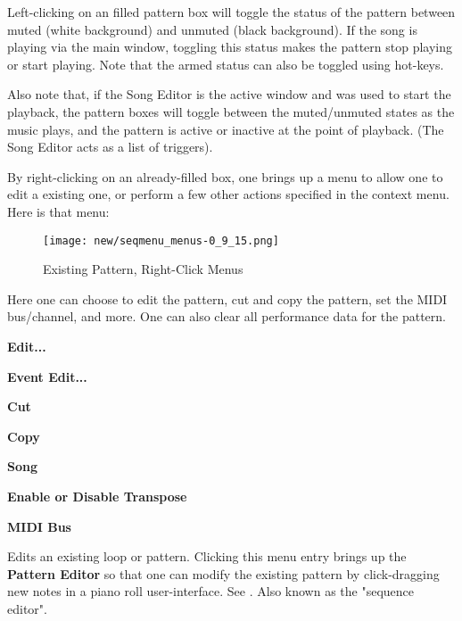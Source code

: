   Left-clicking on an filled pattern box will toggle the status of the
   pattern between muted (white background) and unmuted (black background).
   If the song is playing via the main window, toggling this status makes
   the pattern stop playing or start playing.  Note that the armed status
   can also be toggled using hot-keys.

   Also note that, if the Song Editor is the active window and was used to
   start the playback, the pattern boxes will toggle between the muted/unmuted
   states as the music plays, and the pattern is active or inactive at the
   point of playback.  (The Song Editor acts as a list of triggers).

   By right-clicking on an already-filled box, one brings up a menu
   to allow one to edit a existing one, or perform a few other actions
   specified in the context menu.  Here is that menu:

\begin{figure}[H]
   \centering 
   \texttt{[image: new/seqmenu\_menus-0\_9\_15.png]}
   \caption{Existing Pattern, Right-Click Menus}
   \label{fig:pattern_window_right_click}
\end{figure}

   Here one can choose to edit the pattern, cut and copy the pattern,
   set the MIDI bus/channel, and more.
   One can also clear all performance data for the pattern.
   
   \begin{enumber}
      \item \textbf{Edit...}
      \item \textbf{Event Edit...}
      \item \textbf{Cut}
      \item \textbf{Copy}
      \item \textbf{Song}
      \item \textbf{Enable or Disable Transpose}
      \item \textbf{MIDI Bus}
   \end{enumber}

   \setcounter{ItemCounter}{0}      %

   Edits an existing loop or pattern.
   Clicking this menu entry brings up the \textbf{Pattern Editor}
   so that one can modify the existing pattern by click-dragging new notes in a
   piano roll user-interface.
   See .
   Also known as the "sequence editor".

